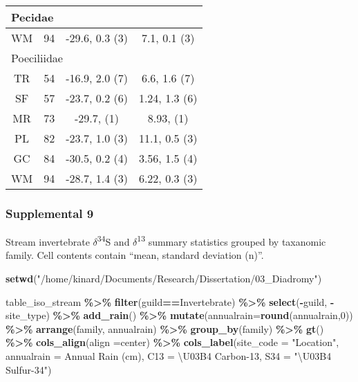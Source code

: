 \documentclass[
]{article}
\newenvironment{Shaded}{\begin{snugshade}}{\end{snugshade}}
\newcommand{\AttributeTok}[1]{\textcolor[rgb]{0.13,0.29,0.53}{#1}}
\newcommand{\DecValTok}[1]{\textcolor[rgb]{0.00,0.00,0.81}{#1}}
\newcommand{\FunctionTok}[1]{\textcolor[rgb]{0.13,0.29,0.53}{\textbf{#1}}}
\newcommand{\NormalTok}[1]{#1}
\newcommand{\SpecialCharTok}[1]{\textcolor[rgb]{0.81,0.36,0.00}{\textbf{#1}}}
\newcommand{\StringTok}[1]{\textcolor[rgb]{0.31,0.60,0.02}{#1}}
\begin{document}
\begin{longtable}{cccc}
\midrule
\multicolumn{4}{l}{Pecidae} \\ 
\midrule
WM & 94 & -29.6, 0.3 (3) & 7.1, 0.1 (3) \\ 
\midrule
\multicolumn{4}{l}{Poeciliidae} \\ 
\midrule
TR & 54 & -16.9, 2.0 (7) & 6.6, 1.6 (7) \\ 
SF & 57 & -23.7, 0.2 (6) & 1.24, 1.3 (6) \\ 
MR & 73 & -29.7,     (1) & 8.93,     (1) \\ 
PL & 82 & -23.7, 1.0 (3) & 11.1, 0.5 (3) \\ 
GC & 84 & -30.5, 0.2 (4) & 3.56, 1.5 (4) \\ 
WM & 94 & -28.7, 1.4 (3) & 6.22, 0.3 (3) \\ 
\bottomrule
\end{longtable}

\newpage

\hypertarget{supplemental-9}{%
\subsubsection{Supplemental 9}\label{supplemental-9}}

Stream invertebrate \(\delta\)\textsuperscript{34}S and
\(\delta\)\textsuperscript{13} summary statistics grouped by taxanomic
family. Cell contents contain ``mean, standard deviation (n)''.

\begin{Shaded}
\begin{Highlighting}[]
\FunctionTok{setwd}\NormalTok{(}\StringTok{"/home/kinard/Documents/Research/Dissertation/03\_Diadromy"}\NormalTok{)}

\NormalTok{table\_iso\_stream }\SpecialCharTok{\%\textgreater{}\%}
  \FunctionTok{filter}\NormalTok{(guild}\SpecialCharTok{==}\StringTok{\textquotesingle{}Invertebrate\textquotesingle{}}\NormalTok{) }\SpecialCharTok{\%\textgreater{}\%}
  \FunctionTok{select}\NormalTok{(}\SpecialCharTok{{-}}\NormalTok{guild, }\SpecialCharTok{{-}}\NormalTok{site\_type) }\SpecialCharTok{\%\textgreater{}\%}
  \FunctionTok{add\_rain}\NormalTok{() }\SpecialCharTok{\%\textgreater{}\%}
  \FunctionTok{mutate}\NormalTok{(}\AttributeTok{annualrain=}\FunctionTok{round}\NormalTok{(annualrain,}\DecValTok{0}\NormalTok{)) }\SpecialCharTok{\%\textgreater{}\%}
  \FunctionTok{arrange}\NormalTok{(family, annualrain) }\SpecialCharTok{\%\textgreater{}\%}
  \FunctionTok{group\_by}\NormalTok{(family) }\SpecialCharTok{\%\textgreater{}\%}
  \FunctionTok{gt}\NormalTok{() }\SpecialCharTok{\%\textgreater{}\%}
  \FunctionTok{cols\_align}\NormalTok{(}\AttributeTok{align =}\StringTok{\textquotesingle{}center\textquotesingle{}}\NormalTok{) }\SpecialCharTok{\%\textgreater{}\%} 
  \FunctionTok{cols\_label}\NormalTok{(}\AttributeTok{site\_code =} \StringTok{"Location"}\NormalTok{,}
             \AttributeTok{annualrain =} \StringTok{\textquotesingle{}Annual Rain (cm)\textquotesingle{}}\NormalTok{,}
             \AttributeTok{C13 =} \StringTok{\textquotesingle{}\textbackslash{}U03B4 Carbon{-}13\textquotesingle{}}\NormalTok{,}
             \AttributeTok{S34 =} \StringTok{"\textbackslash{}U03B4 Sulfur{-}34"}\NormalTok{)}
\end{Highlighting}
\end{Shaded}
\end{document}
